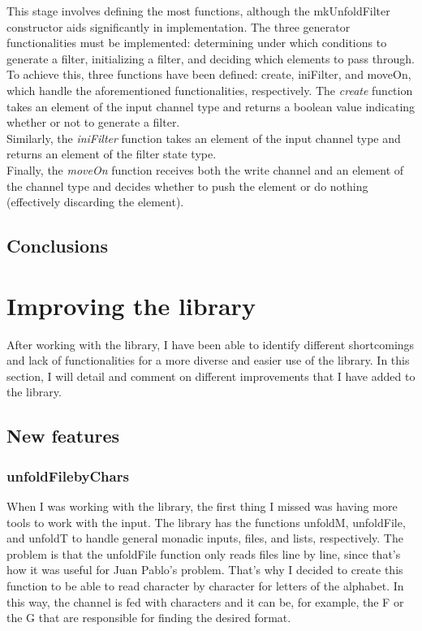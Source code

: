 This stage involves defining the most functions, although the mkUnfoldFilter constructor aids significantly in implementation.
The three generator functionalities must be implemented: determining under which conditions to generate a filter, initializing a filter, and deciding which elements to pass through.
To achieve this, three functions have been defined: create, iniFilter, and moveOn, which handle the aforementioned functionalities, respectively.
The \textit{create} function takes an element of the input channel type and returns a boolean value indicating whether or not to generate a filter. \\
Similarly, the \textit{iniFilter} function takes an element of the input channel type and returns an element of the filter state type. \\
Finally, the \textit{moveOn} function receives both the write channel and an element of the channel type and decides whether to push the element or do nothing (effectively discarding the element). 

\subsection{Conclusions}
\section{Improving the library}
After working with the library, I have been able to identify different shortcomings and lack of functionalities for a more diverse and easier use of the library.
In this section, I will detail and comment on different improvements that I have added to the library.

\subsection{New features}
\subsubsection*{unfoldFilebyChars}

When I was working with the library, the first thing I missed was having more tools to work with the input.
The library has the functions unfoldM, unfoldFile, and unfoldT to handle general monadic inputs, files, and lists, respectively.
The problem is that the unfoldFile function only reads files line by line, since that's how it was useful for Juan Pablo's problem.
That's why I decided to create this function to be able to read character by character for letters of the alphabet.
In this way, the channel is fed with characters and it can be, for example, the F or the G that are responsible for finding the desired format.

